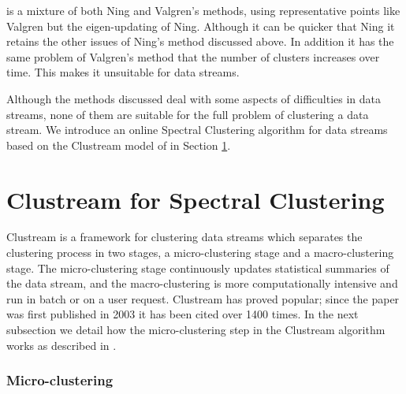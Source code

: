 \cite{Kong2011} is a mixture of both Ning and Valgren's methods, using representative points like Valgren but the eigen-updating of Ning. Although it can be quicker that Ning it retains the other issues of Ning's method discussed above. In addition it has the same problem of Valgren's method that the number of clusters increases over time. This makes it unsuitable for data streams. %


Although the methods discussed deal with some aspects of difficulties in data streams, none of them are suitable for the full problem of clustering a data stream. We introduce an online Spectral Clustering algorithm for data streams based on the Clustream model of \cite{Aggarwal2003} in Section \ref{sec:microSpec}.


\section{Clustream for Spectral Clustering}
\label{sec:microSpec}
 
Clustream \citep{Aggarwal2003} is a framework for clustering data streams which separates the clustering process in two stages, a micro-clustering stage and a macro-clustering stage. The  micro-clustering stage continuously updates statistical summaries of the data stream, and the macro-clustering is more computationally intensive and run in batch or on a user request. Clustream has proved popular; since the paper was first published in 2003 it has been cited over 1400 times. In the next subsection we detail how the micro-clustering step in the Clustream algorithm works as described in \cite{Aggarwal2003}. %

\subsubsection{Micro-clustering}

